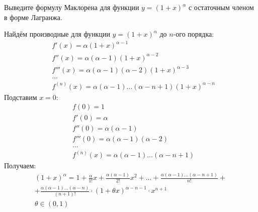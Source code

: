 \begin{question}
    Выведите формулу Маклорена для функции $y = (1 + x)^\alpha$ с остаточным членом в форме Лагранжа.
\end{question}
\begin{answer}
    Найдём производные для функции $y = (1 + x)^\alpha$ до $n$-ого порядка:
    \begin{align*}
        &f'(x) = \alpha(1 + x)^{\alpha-1} \\
        &f''(x) = \alpha(\alpha - 1)(1 + x)^{\alpha - 2} \\
        &f'''(x) = \alpha(\alpha - 1)(\alpha - 2)(1 + x)^{\alpha - 3} \\
        &\ldots \\
        &f ^{(n)}(x) = \alpha(\alpha - 1)\ldots(\alpha - n + 1)(1 + x) ^{\alpha - n}
    \end{align*}
    Подставим $x = 0$:
    \begin{align*}
        &f(0) = 1 \\
        &f'(0) = \alpha \\
        &f''(0) = \alpha(\alpha - 1) \\
        &f'''(0) = \alpha(\alpha - 1)(\alpha - 2) \\
        &\ldots \\
        &f ^{(n)}(x) = \alpha(\alpha - 1)\ldots(\alpha - n + 1)
    \end{align*}
    Получаем:
    \begin{gather*}
        (1 + x)^\alpha = 1 + \frac{\alpha}{1!} x + \frac{\alpha(\alpha - 1)}{2!} x ^2 + \ldots + \frac{\alpha(\alpha-1)\ldots(\alpha - n + 1)}{n!} + \\
        + \frac{\alpha(\alpha - 1)\ldots(\alpha - n)}{(n+1)!} \cdot (1 + \theta x) ^{\alpha - n - 1} \cdot x ^{n + 1} \\
        \theta \in (0, 1)
    \end{gather*}
\end{answer}
\pagebreak



